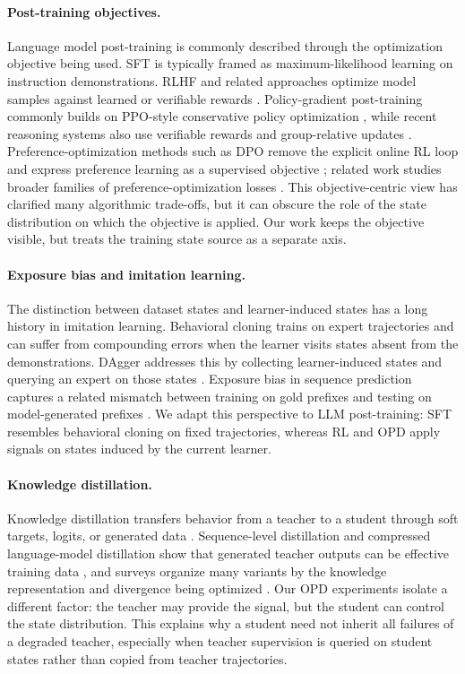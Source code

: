 \documentclass{article}
\begin{document}
\paragraph{Post-training objectives.}
Language model post-training is commonly described through the optimization
objective being used. SFT is typically framed as maximum-likelihood learning on
instruction demonstrations. RLHF and related approaches optimize model samples
against learned or verifiable rewards
\citep{christiano2017deep,ziegler2019fine,stiennon2020learning,ouyang2022training}.
Policy-gradient post-training commonly builds on PPO-style conservative policy
optimization \citep{schulman2017proximal}, while recent reasoning systems also
use verifiable rewards and group-relative updates \citep{shao2024deepseekmath}.
Preference-optimization methods such as DPO remove the explicit online RL loop
and express preference learning as a supervised objective
\citep{rafailov2023direct}; related work studies broader families of
preference-optimization losses \citep{azar2024general}. This objective-centric
view has clarified many algorithmic trade-offs, but it can obscure the role of
the state distribution on which the objective is applied. Our work keeps the
objective visible, but treats the training state source as a separate axis.

\paragraph{Exposure bias and imitation learning.}
The distinction between dataset states and learner-induced states has a long
history in imitation learning. Behavioral cloning trains on expert trajectories
and can suffer from compounding errors when the learner visits states absent
from the demonstrations. DAgger addresses this by collecting learner-induced
states and querying an expert on those states \citep{ross2011reduction}. Exposure
bias in sequence prediction captures a related mismatch between training on
gold prefixes and testing on model-generated prefixes
\citep{bengio2015scheduled,ranzato2015sequence}. We adapt this perspective to
LLM post-training: SFT resembles behavioral cloning on fixed trajectories,
whereas RL and OPD apply signals on states induced by the current learner.

\paragraph{Knowledge distillation.}
Knowledge distillation transfers behavior from a teacher to a student through
soft targets, logits, or generated data
\citep{buciluǎ2006model,hinton2015distilling}. Sequence-level distillation and
compressed language-model distillation show that generated teacher outputs can
be effective training data \citep{kim2016sequence,sanh2019distilbert}, and
surveys organize many variants by the knowledge representation and divergence
being optimized \citep{gou2021knowledge}. Our OPD experiments isolate a
different factor: the teacher may provide the signal, but the student can
control the state distribution. This explains why a student need not inherit all
failures of a degraded teacher, especially when teacher supervision is queried
on student states rather than copied from teacher trajectories.
\end{document}
